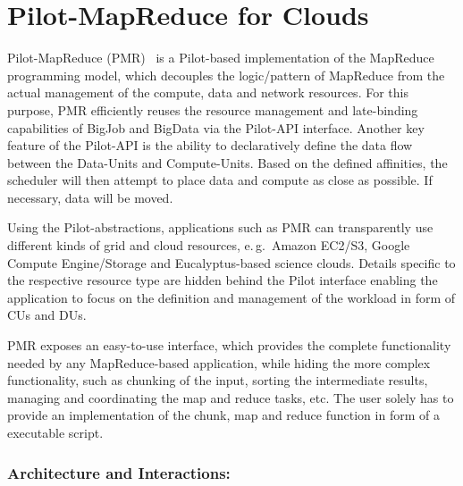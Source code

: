 \documentclass[times]{cpeauth}
\newcommand{\pilot}{Pilot\xspace}
\newcommand{\computeunits}{Compute-Units\xspace}
\newcommand{\dataunits}{Data-Units\xspace}
\newcommand{\dus}{DUs\xspace}
\newcommand{\cus}{CUs\xspace}
\begin{document}
\section{Pilot-MapReduce for Clouds}
\label{sec:pmr}

Pilot-MapReduce (PMR)~\cite{Mantha:2012:PEF:2287016.2287020} is a \pilot-based
implementation of the MapReduce programming model, which decouples the
logic/pattern of MapReduce from the actual management of the compute, data and
network resources. For this purpose, PMR efficiently reuses the resource
management and late-binding capabilities of BigJob and BigData via the 
\pilot-API interface. Another key feature of the \pilot-API is the ability to 
declaratively define the data flow between the \dataunits and \computeunits. 
Based on the defined affinities, the scheduler will then attempt to place data 
and compute as close as possible. If necessary, data will be moved. 

Using the \pilot-abstractions, applications such as PMR can transparently use
different kinds of grid and cloud resources, e.\,g.\ Amazon EC2/S3, Google
Compute Engine/Storage and Eucalyptus-based science clouds. Details specific
to the respective resource type are hidden behind the \pilot interface
enabling the application to focus on the definition and management of the
workload in form of \cus and \dus.

PMR exposes an easy-to-use interface, which provides the complete
functionality needed by any MapReduce-based application, while hiding the more
complex functionality, such as chunking of the input, sorting the intermediate
results, managing and coordinating the map and reduce tasks, etc. The user
solely has to provide an implementation of the chunk, map and reduce function
in form of a executable script.

\subsubsection*{Architecture and Interactions:}
\end{document}
